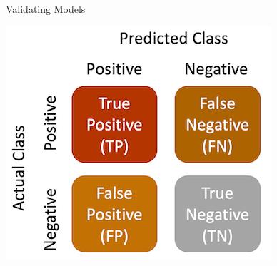\documentclass[handout]{beamer}
\begin{document}
\begin{frame}{Validating Models}
	
	\begin{center}
		\includegraphics{../pictures/classificationmatrix_words.png} \\\
	\end{center}
	



		
\end{frame}
\end{document}
